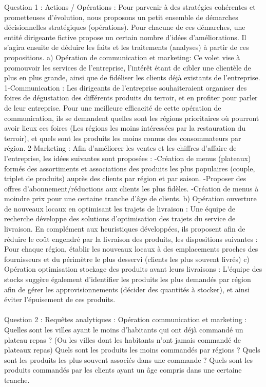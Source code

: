 \pragraph{} Question 1 : Actions / Opérations : 
Pour parvenir à des stratégies cohérentes et prometteuses d’évolution, nous proposons un petit ensemble de démarches décisionnelles stratégiques (opérations). Pour chacune de ces démarches, une entité dirigeante fictive propose un certain nombre d’idées d’améliorations.
Il s’agira ensuite de déduire les faits et les traitements (analyses) à partir de ces propositions.
a)	Opération de communication et marketing: 
Ce volet vise à promouvoir les services de l’entreprise, l’intérêt étant de cibler une clientèle de plus en plus grande, ainsi que de fidéliser les clients déjà existants de l’entreprise.
1-Communication : Les dirigeants de l’entreprise souhaiteraient organiser des foires de dégustation des différents produits du terroir, et en profiter pour parler de leur entreprise.  Pour une meilleure efficacité de cette opération de communication, ils se demandent quelles sont les régions prioritaires où pourront avoir lieux ces foires (Les régions les moins intéressées par la restauration du terroir), et quels sont les produits les moins connus des consommateurs par région.
2-Marketing : Afin d’améliorer les ventes et les chiffres d’affaire de l’entreprise, les idées suivantes sont proposées : 
-Création de menus (plateaux) formés des assortiments et associations des produits les plus populaires (couple, triplet de produits) auprès des clients par région et par saison.
-Proposer des offres d’abonnement/réductions aux clients les plus fidèles.
-Création de menus à moindre prix pour une certaine tranche d’âge de clients.
b)	Opération ouverture de nouveaux locaux en optimisant les trajets de livraison : 
Une équipe de recherche développe des solutions d’optimisation des trajets du service de livraison. En complément aux heuristiques développées, ils proposent afin de réduire le coût engendré par la livraison des produits, les dispositions suivantes : 
Pour chaque région, établir les nouveaux locaux à des emplacements proches des fournisseurs et du périmètre le plus desservi (clients les plus souvent livrés)
c)	Opération optimisation stockage des produits avant leurs livraisons : 
L’équipe des stocks suggère également d’identifier les produits les plus demandés par région afin de gérer les approvisionnements (décider des quantités à stocker), et ainsi éviter l’épuisement de ces produits.

\paragraph{} Question 2 : Requêtes analytiques :  
Opération communication et marketing : 
Quelles sont les villes ayant le moins d’habitants qui ont déjà commandé un plateau repas ? (Ou les villes dont les habitants n’ont jamais commandé de plateaux repas)
Quels sont les produits les moins commandés par régions ? 
Quels sont les produits les plus souvent associés dans une commande ?
Quels sont les produits commandés par les clients ayant un âge compris dans une certaine tranche.

